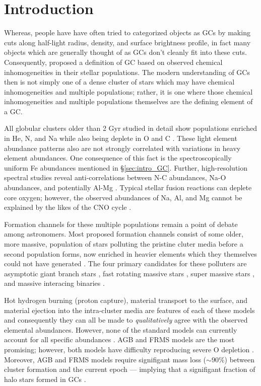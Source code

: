 \section{Introduction}\label{sec:Intro}
Whereas, people have have often tried to categorized objects as GCs by making
cuts along half-light radius, density, and surface brightness profile, in fact
many objects which are generally thought of as GCs don't cleanly fit into these
cuts. Consequently, \citet{Carretta2010} proposed a definition of GC based on
observed chemical inhomogeneities in their stellar populations. The modern
understanding of GCs then is not simply one of a dense cluster of stars which
may have chemical inhomogeneities and multiple populations; rather, it is one
where those chemical inhomogeneities and multiple populations themselves are
the defining element of a GC.

All globular clusters older than 2 Gyr studied in detail show populations
enriched in He, N, and Na while also being deplete in O and C
\citep{Piotto2015,Bastian2018}. These light element abundance patterns also are
not strongly correlated with variations in heavy element abundances. One
consequence of this fact is the spectroscopically uniform Fe abundances
mentioned in \S\ref{sec:intro_GC}. Further, high-resolution spectral studies
reveal anti-correlations between N-C abundances, Na-O abundances, and
potentially Al-Mg \citep{Sneden1992, Gratton2012}. Typical stellar fusion
reactions can deplete core oxygen; however, the observed abundances of Na, Al,
and Mg cannot be explained by the likes of the CNO cycle \citep{Prantzos2007}.

Formation channels for these multiple populations remain a point of debate
among astronomers. Most proposed formation channels consist of some older,
more massive, population of stars polluting the pristine cluter media before a
second population forms, now enriched in heavier elements which they themselves could
not have generated \citep[for a detailed review see ][]{Gratton2012}. The four
primary candidates for these polluters are asymptotic giant branch stars
\citep[AGBs,][]{Ventura2001,DErcole2010}, fast rotating massive stars
\citep[FRMSs,][]{Decressin2007}, super massive stars
\citep[SMSs,][]{Denissenkov2014}, and massive interacing binaries
\citep[MIBs,][]{deMink2009, Bastian2018}. 

Hot hydrogen burning (proton capture), material transport to the surface, and
material ejection into the intra-cluster media are features of each of these
models and consequently they can all be made to {\it qualitatively} agree with
the observed elemental abundances. However, none of the standard models can
currently account for all specific abundances \citep{Gratton2012}. AGB and FRMS
models are the most promising; however, both models have difficulty reproducing
severe O depletion \citep{Ventura2009,Decressin2007}. Moreover, AGB and FRMS
models require signifigant mass loss ($\sim 90\%$) between cluster formation
and the current epoch --- implying that a signifigant fraction of halo stars
formed in GCs \citep{Renzini2008,DErcole2008,Bastian2015}.

